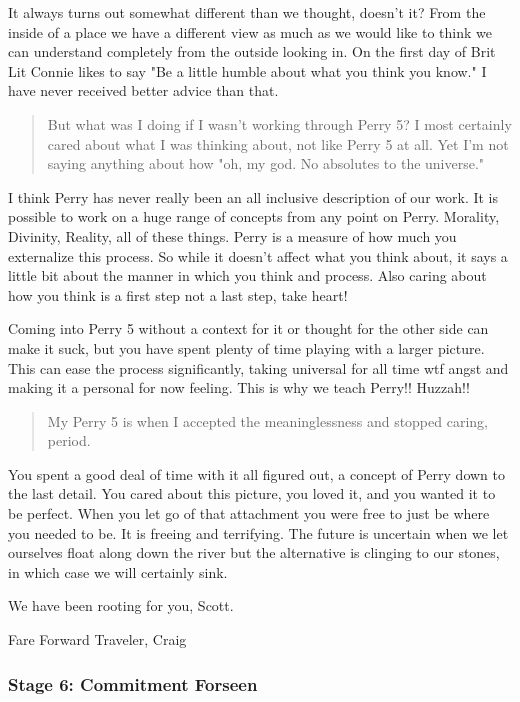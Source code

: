 It always turns out somewhat different than we thought, doesn't it?  From
the inside of a place we have a different view as much as we would like to
think we can understand completely from the outside looking in.  On the
first day of Brit Lit Connie likes to say "Be a little humble about what you
think you know."  I have never received better advice than that.

	\begin{quote}
But what was I doing if I wasn't working through Perry 5? I most certainly
 cared about what I was thinking about, not like Perry 5 at all.  Yet I'm not
 saying anything about how "oh, my god. No absolutes to the universe."
	\end{quote}
	
 I think Perry has never really been an all inclusive description of our
work.  It is possible to work on a huge range of concepts from any point on
Perry.  Morality, Divinity, Reality, all of these things.  Perry is a
measure of how much you externalize this process.  So while it doesn't
affect what you think about, it says a little bit about the manner in which
you think and process.  Also caring about how you think is a first step not
a last step, take heart!

Coming into Perry 5 without a context for it or thought for the other side
can make it suck, but you have spent plenty of time playing with a larger
picture.  This can ease the process significantly, taking universal for all
time wtf angst and making it a personal for now feeling.  This is why we
teach Perry!! Huzzah!!


\begin{quote}
 My Perry 5 is when I accepted the meaninglessness and stopped caring,
 period.
\end{quote}

You spent a good deal of time with it all figured out,  a concept of Perry
down to the last detail.  You cared about this picture, you loved it, and
you wanted it to be perfect.  When you let go of that attachment you were
free to just be where you needed to be.  It is freeing and terrifying.  The
future is uncertain when we let ourselves float along down the river but the
alternative is clinging to our stones, in which case we will certainly sink.


We have been rooting for you, Scott.

Fare Forward Traveler,
Craig

\subsubsection{Stage 6: Commitment Forseen}

